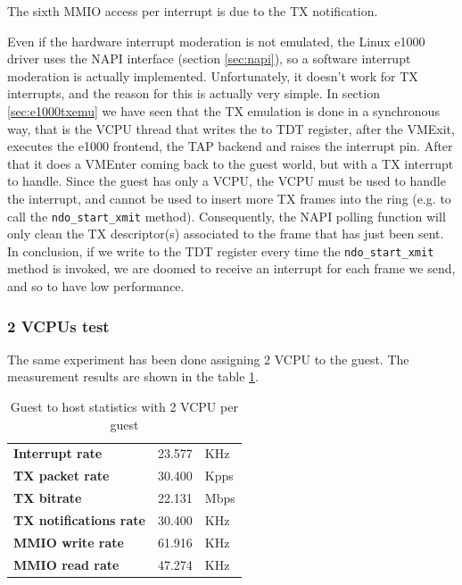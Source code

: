 The sixth MMIO access per interrupt is due to the TX notification.

\vspace{0.5cm}

Even if the hardware interrupt moderation is not emulated, the Linux e1000 driver uses the NAPI interface (section \ref{sec:napi}), so 
a software interrupt
moderation is actually implemented. Unfortunately, it doesn't work for TX interrupts, and the reason for this is actually very simple.
In section \ref{sec:e1000txemu} we have seen that the TX emulation is done in a synchronous way, that is the VCPU thread that writes
the to TDT register, after the VMExit, executes the e1000 frontend, the TAP backend and raises the interrupt pin. After that
it does a VMEnter coming back to the guest world, but with a TX interrupt to handle. Since the guest
has only a VCPU, the VCPU must be used to handle the interrupt, and cannot be used to insert more TX frames into the ring (e.g. to call
the \texttt{ndo\_start\_xmit} method). Consequently, the NAPI polling function will only clean the TX descriptor(s) associated to the
frame that has just been sent.
In conclusion, if we write to the TDT register every time the \texttt{ndo\_start\_xmit} method is invoked, we are doomed to receive
an interrupt for each frame we send, and so to have low performance.


\subsubsection{2 VCPUs test}
The same experiment has been done assigning 2 VCPU to the guest. The measurement results are shown in the table \ref{tab:e1000-tx-g2h2vcpu}.

\begin{table}
\begin{center}
\begin{tabular}{lrl}
\toprule
\textbf{Interrupt rate} & 23.577 & KHz\\
\textbf{TX packet rate} & 30.400 & Kpps\\
\textbf{TX bitrate} & 22.131 & Mbps\\
\textbf{TX notifications rate} & 30.400 & KHz\\
\textbf{MMIO write rate} & 61.916 & KHz\\
\textbf{MMIO read rate} & 47.274 & KHz\\
\bottomrule
\end{tabular}
\end{center}
\caption{Guest to host statistics with 2 VCPU per guest}
\label{tab:e1000-tx-g2h2vcpu}
\end{table}

